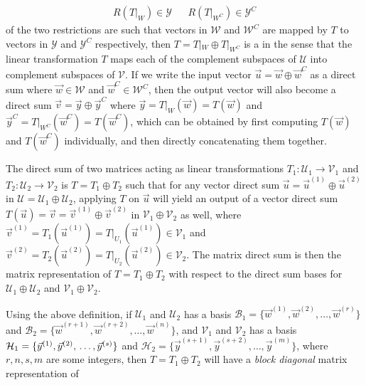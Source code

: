 \begin{align*}
R(T|_W) \in \mathcal{Y} & & R(T|_{W^C}) \in \mathcal{Y}^C
\end{align*}
of the two restrictions are such that vectors in $\mathcal{W}$ and $\mathcal{W}^C$ are mapped by $T$ to vectors in $\mathcal{Y}$ and $\mathcal{Y}^C$ respectively, then $T = T|_W \oplus T|_{W^C}$ is a  in the sense that the linear transformation $T$ maps each of the complement subspaces of $\mathcal{U}$ into complement subspaces of $\mathcal{V}$. If we write the input vector $\vec{u} = \vec{w} \oplus \vec{w}^C$ as a direct sum where $\vec{w} \in \mathcal{W}$ and $\vec{w}^C \in \mathcal{W}^C$, then the output vector will also become a direct sum $\vec{v} = \vec{y} \oplus \vec{y}^C$ where $\vec{y} = T|_W(\vec{w}) = T(\vec{w})$ and $\vec{y}^C = T|_{W^C}(\vec{w}^C) = T(\vec{w}^C)$, which can be obtained by first computing $T(\vec{w})$ and $T(\vec{w}^C)$ individually, and then directly concatenating them together.
\begin{defn}
\label{defn:matdirectsum}
The direct sum of two matrices acting as linear transformations $T_1: \mathcal{U}_1 \to \mathcal{V}_1$ and $T_2: \mathcal{U}_2 \to \mathcal{V}_2$ is $T = T_1 \oplus T_2$ such that for any vector direct sum $\vec{u} = \vec{u}^{(1)} \oplus \vec{u}^{(2)}$ in $\mathcal{U} = \mathcal{U}_1 \oplus \mathcal{U}_2$, applying $T$ on $\vec{u}$ will yield an output of a vector direct sum $T(\vec{u}) = \vec{v} = \vec{v}^{(1)} \oplus \vec{v}^{(2)}$ in $\mathcal{V}_1 \oplus \mathcal{V}_2$ as well, where $\vec{v}^{(1)} = T_1(\vec{u}^{(1)}) = T|_{U_1}(\vec{u}^{(1)}) \in \mathcal{V}_1$ and $\vec{v}^{(2)} = T_2(\vec{u}^{(2)}) = T|_{U_2}(\vec{u}^{(2)}) \in \mathcal{V}_2$. The matrix direct sum is then the matrix representation of $T = T_1 \oplus T_2$ with respect to the direct sum bases for $\mathcal{U}_1 \oplus \mathcal{U}_2$ and $\mathcal{V}_1 \oplus \mathcal{V}_2$.
\end{defn}
Using the above definition, if $\mathcal{U}_1$ and $\mathcal{U}_2$ has a basis $\mathcal{B}_1 = \{\vec{w}^{(1)}, \vec{w}^{(2)}, \ldots, \vec{w}^{(r)}\}$ and $\mathcal{B}_2 = \{\vec{w}^{(r+1)}, \vec{w}^{(r+2)}, \ldots, \vec{w}^{(n)}\}$, and $\mathcal{V}_1$ and $\mathcal{V}_2$ has a basis $\mathcal{H}_1 = \{\vec{y}^{(1)}, \vec{y}^{(2)}, \\ \ldots, \vec{y}^{(s)}\}$ and $\mathcal{H}_2 = \{\vec{y}^{(s+1)}, \vec{y}^{(s+2)}, \ldots, \vec{y}^{(m)}\}$, where $r, n, s, m$ are some integers, then $T = T_1 \oplus T_2$ will have a \textit{block diagonal} matrix representation of
